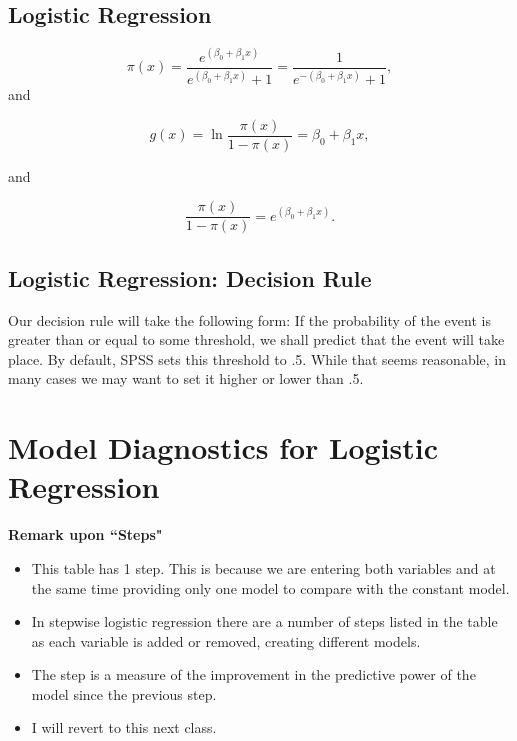 \documentclass[a4paper,12pt]{article}
\begin{document}
\subsection{Logistic Regression}

\[ \pi(x) = \frac{e^{(\beta_0 + \beta_1 x)}} {e^{(\beta_0 + \beta_1 x)} + 1} = \frac {1} {e^{-(\beta_0 + \beta_1 x)} + 1},\]
and

\[g(x) = \ln \frac {\pi(x)} {1 - \pi(x)} = \beta_0 + \beta_1 x ,\]

and

\[\frac{\pi(x)} {1 - \pi(x)} = e^{(\beta_0 + \beta_1 x)}.\]




\subsection{Logistic Regression: Decision Rule}
Our decision rule will take the following form: If the probability of the event is greater than or equal to some threshold, we shall predict that the event will take place. By default, SPSS sets this threshold to .5. While that seems reasonable, in many cases we may want to set it higher or lower than .5.


\section{Model Diagnostics for Logistic Regression}


\noindent \textbf{Remark upon ``Steps"}
\begin{itemize}
	\item This table has 1 step. This is because we are entering both variables and at the same
	time providing only one model to compare with the constant model. 
	\item In stepwise logistic regression there are a number of steps listed in the table as each variable is added or
	removed, creating different models. 
	\item The step is a measure of the improvement in the
	predictive power of the model since the previous step. 
	\item I will revert to this next class.
\end{itemize}
\end{document}
